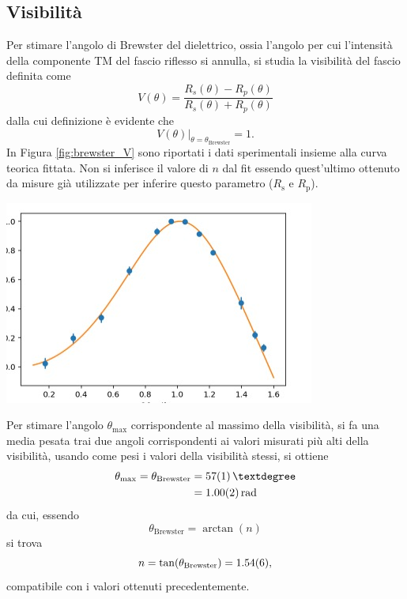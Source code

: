\documentclass[10pt,oneside,a4paper]{article}
\newenvironment{Figure}
  {\par\medskip\noindent\minipage{\linewidth}}
  {\endminipage\par\medskip}
\begin{document}
\begin{multicols}{2}
\subsection{Visibilità}
Per stimare l'angolo di Brewster del dielettrico, ossia l'angolo per cui l'intensità della componente TM del fascio riflesso si annulla, si studia la visibilità del fascio definita come
\begin{equation}\label{eq:visibilità}
	V(\theta) = \frac{R_s(\theta) - R_p(\theta)}{R_s(\theta) + R_p(\theta)}
\end{equation}
dalla cui definizione è evidente che
\begin{equation}
	\left. V(\theta) \right\vert_{\theta = \theta_\mathrm{Brewster}} = 1.
\end{equation}
In Figura \ref{fig:brewster_V} sono riportati i dati sperimentali insieme alla curva teorica fittata. Non si inferisce il valore di $n$ dal fit essendo quest'ultimo ottenuto da misure già utilizzate per inferire questo parametro ($R_\mathrm{s}$ e $R_\mathrm{p}$).
\begin{Figure}
	\begin{center}
	\includegraphics[width=\linewidth]{visibilita.jpg}
	\label{fig:brewster_V}
	\end{center}
\end{Figure}
Per stimare l'angolo $\theta_\mathrm{max}$ corrispondente al massimo della visibilità, si fa una media pesata trai due angoli corrispondenti ai valori misurati più alti della visibilità, usando come pesi i valori della visibilità stessi, si ottiene
\begin{align}
	\theta_\mathrm{max} = \theta_\mathrm{Brewster} &= \SI{57 \pm 1}{°} \\ &= \SI{1.00 \pm 0.02}{\mathrm{rad}}
\end{align}
da cui, essendo 
\begin{equation}
	\theta_\mathrm{Brewster} = \arctan (n)
\end{equation}
si trova 
\begin{equation}
	n = \tan (\theta_\mathrm{Brewster} )= \SI{1.54 \pm 0.06}{},
\end{equation}
compatibile con i valori ottenuti precedentemente.

\end{multicols}
\end{document}
